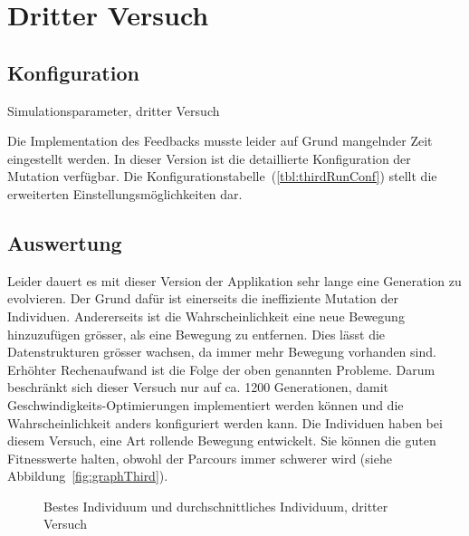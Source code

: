   \section{Dritter Versuch}

    \subsection{Konfiguration}

      \begin{table}[H]
        \centering
        
        \caption{Simulationsparameter, dritter Versuch\label{tbl:thirdRunConf}}
      \end{table}

      Die Implementation des Feedbacks musste leider auf Grund mangelnder Zeit eingestellt werden.
      In dieser Version ist die detaillierte Konfiguration der Mutation verfügbar.
      Die Konfigurationstabelle~(\vref{tbl:thirdRunConf}) stellt die erweiterten Einstellungsmöglichkeiten dar.

    \subsection{Auswertung\label{sub:thirdAuswertung}}

      Leider dauert es mit dieser Version der Applikation sehr lange eine Generation zu evolvieren.
      Der Grund dafür ist einerseits die ineffiziente Mutation der Individuen.
      Andererseits ist die Wahrscheinlichkeit eine neue Bewegung hinzuzufügen grösser, als eine Bewegung zu entfernen.
      Dies lässt die Datenstrukturen grösser wachsen, da immer mehr Bewegung vorhanden sind.
      Erhöhter Rechenaufwand ist die Folge der oben genannten Probleme.
      Darum beschränkt sich dieser Versuch nur auf ca. 1200 Generationen,
      damit Geschwindigkeits-Optimierungen implementiert werden können und die Wahrscheinlichkeit anders konfiguriert werden kann.
      Die Individuen haben bei diesem Versuch, eine Art rollende Bewegung entwickelt.
      Sie können die guten Fitnesswerte halten,
      obwohl der Parcours immer schwerer wird (siehe Abbildung~\vref{fig:graphThird}).

      \begin{figure}
        \centering
        
        \caption{Bestes Individuum und durchschnittliches Individuum, dritter Versuch\label{fig:graphThird}}
      \end{figure}

